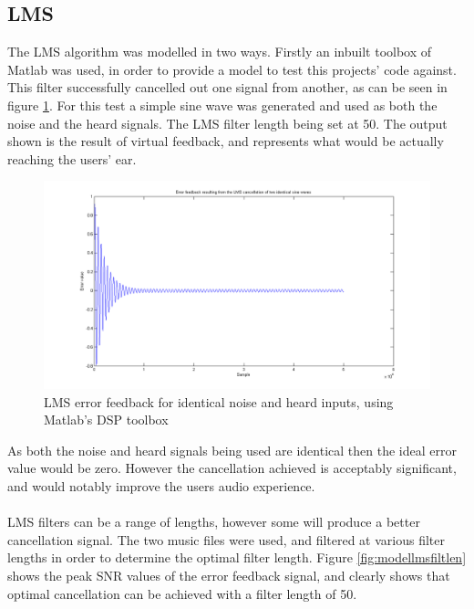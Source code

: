 \subsection{LMS}
The LMS algorithm was modelled in two ways.
Firstly an inbuilt toolbox of Matlab was used, in order to provide a model to test this projects' code against.
This filter successfully cancelled out one signal from another, as can be seen in figure \ref{fig:modellmscancel}.
For this test a simple sine wave was generated and used as both the noise and the heard signals.
The LMS filter length being set at 50.
The output shown is the result of virtual feedback, and represents what would be actually reaching the users' ear.

\begin{figure}[H]
	\centering
	\includegraphics[width=\textwidth]{./img/lmssnr_cancel.png}
	\caption{LMS error feedback for identical noise and heard inputs, using Matlab's DSP toolbox}
	\label{fig:modellmscancel}
\end{figure}

\noindent As both the noise and heard signals being used are identical then the ideal error value would be zero.
However the cancellation achieved is acceptably significant, and would notably improve the users audio experience.
\\
\\
LMS filters can be a range of lengths, however some will produce a better cancellation signal.
The two music files were used, and filtered at various filter lengths in order to determine the optimal filter length.
Figure \ref{fig:modellmsfiltlen} shows the peak SNR values of the error feedback signal, and clearly shows that optimal cancellation can be achieved with a filter length of 50.

